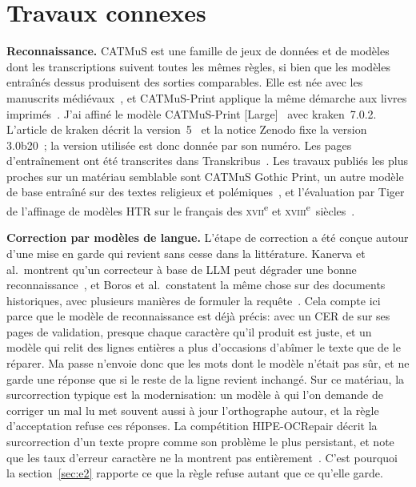 \section{Travaux connexes}
\label{sec:related}

\textbf{Reconnaissance.} CATMuS est une famille de jeux de données et de
modèles dont les transcriptions suivent toutes les mêmes règles, si bien que
les modèles entraînés dessus produisent des sorties comparables. Elle est née
avec les manuscrits médiévaux~\cite{clerice2024catmusmedieval}, et CATMuS-Print
applique la même démarche aux livres imprimés~\cite{gabay2024catmusprint}. J'ai
affiné le modèle CATMuS-Print [Large]~\cite{gabay2024catmusprintlarge} avec
kraken~7.0.2. L'article de kraken décrit la version~5~\cite{kiessling2025kraken}
et la notice Zenodo fixe la version 3.0b20~\cite{kiessling2021krakensoftware};
la version utilisée est donc donnée par son numéro. Les pages d'entraînement
ont été transcrites dans Transkribus~\cite{kahle2017transkribus,
muehlberger2019transkribus}. Les travaux publiés les plus proches sur un
matériau semblable sont CATMuS Gothic Print, un autre modèle de base entraîné
sur des textes religieux et polémiques~\cite{solfrini2024catmusgothic}, et
l'évaluation par Tiger de l'affinage de modèles HTR sur le français des
\textsc{xvii}\textsuperscript{e} et \textsc{xviii}\textsuperscript{e}~siècles~\cite{tiger2026overfit}.

\textbf{Correction par modèles de langue.} L'étape de correction a été conçue
autour d'une mise en garde qui revient sans cesse dans la littérature. Kanerva
et al.\ montrent qu'un correcteur à base de LLM peut dégrader une bonne
reconnaissance~\cite{kanerva2025nofreelunches}, et Boros et al.\ constatent la
même chose sur des documents historiques, avec plusieurs manières de formuler
la requête~\cite{boros2024postcorrection}. Cela compte ici parce que le modèle
de reconnaissance est déjà précis: avec un CER de \trainCer{} sur ses pages de
validation, presque chaque caractère qu'il produit est juste, et un modèle qui
relit des lignes entières a plus d'occasions d'abîmer le texte que de le
réparer. Ma passe n'envoie donc que les mots dont le modèle n'était pas sûr, et
ne garde une réponse que si le reste de la ligne revient inchangé. Sur ce
matériau, la surcorrection typique est la modernisation: un modèle à qui l'on
demande de corriger un  mal lu met souvent aussi à jour l'orthographe
autour, et la règle d'acceptation refuse ces réponses. La compétition
HIPE-OCRepair décrit la surcorrection d'un texte propre comme son problème le
plus persistant, et note que les taux d'erreur caractère ne la montrent pas
entièrement~\cite{ehrmann2026hipeocrepair}. C'est pourquoi la
section~\ref{sec:e2} rapporte ce que la règle refuse autant que ce qu'elle
garde.

